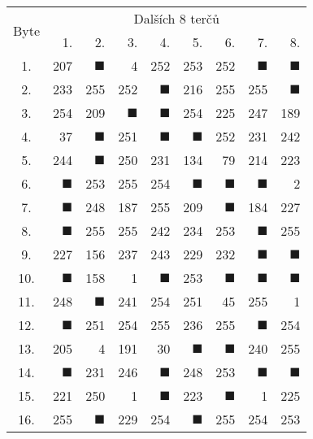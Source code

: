 \begin{tabular}{| c | r | r | r | r | r | r | r | r |}
	\hline
	\multirow{2}{*}{Byte} & \multicolumn{8}{c|}{Dalších $8$ terčů} \\
	\cline{2-9}
	~ & 1. & 2. & 3. & 4. & 5. & 6. & 7. & 8. \\
	\hline
	1.&207&$\blacksquare$&4&252&253&252&$\blacksquare$&$\blacksquare$\\
	\hline
	2.&233&255&252&$\blacksquare$&216&255&255&$\blacksquare$\\
	\hline
	3.&254&209&$\blacksquare$&$\blacksquare$&254&225&247&189\\
	\hline
	4.&37&$\blacksquare$&251&$\blacksquare$&$\blacksquare$&252&231&242\\
	\hline
	5.&244&$\blacksquare$&250&231&134&79&214&223\\
	\hline
	6.&$\blacksquare$&253&255&254&$\blacksquare$&$\blacksquare$&$\blacksquare$&2\\
	\hline
	7.&$\blacksquare$&248&187&255&209&$\blacksquare$&184&227\\
	\hline
	8.&$\blacksquare$&255&255&242&234&253&$\blacksquare$&255\\
	\hline
	9.&227&156&237&243&229&232&$\blacksquare$&$\blacksquare$\\
	\hline
	10.&$\blacksquare$&158&1&$\blacksquare$&253&$\blacksquare$&$\blacksquare$&$\blacksquare$\\
	\hline
	11.&248&$\blacksquare$&241&254&251&45&255&1\\
	\hline
	12.&$\blacksquare$&251&254&255&236&255&$\blacksquare$&254\\
	\hline
	13.&205&4&191&30&$\blacksquare$&$\blacksquare$&240&255\\
	\hline
	14.&$\blacksquare$&231&246&$\blacksquare$&248&253&$\blacksquare$&$\blacksquare$\\
	\hline
	15.&221&250&1&$\blacksquare$&223&$\blacksquare$&1&225\\
	\hline
	16.&255&$\blacksquare$&229&254&$\blacksquare$&255&254&253\\
	\hline
\end{tabular}